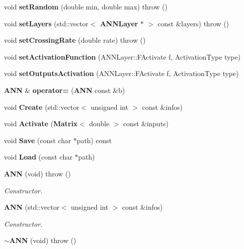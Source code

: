 \begin{DoxyCompactItemize}
\item 
void {\bfseries set\+Random} (double min, double max)  throw ()\label{class_g_a_n_n_1_1_a_n_n_adcedd9edf79df8a07a25d11cdefb5310}

\item 
void {\bfseries set\+Layers} (std\+::vector$<$ {\bf A\+N\+N\+Layer} $\ast$ $>$ const \&layers)  throw ()\label{class_g_a_n_n_1_1_a_n_n_aae6cc0117e368dec728e5164fd4877cc}

\item 
void {\bfseries set\+Crossing\+Rate} (double rate)  throw ()\label{class_g_a_n_n_1_1_a_n_n_a4476dd0e4d95747cae5489db42639190}

\item 
void {\bfseries set\+Activation\+Function} (A\+N\+N\+Layer\+::\+F\+Activate f, Activation\+Type type)\label{class_g_a_n_n_1_1_a_n_n_a416cb5c5b0d916a9f2ed005494f07be6}

\item 
void {\bfseries set\+Outputs\+Activation} (A\+N\+N\+Layer\+::\+F\+Activate f, Activation\+Type type)\label{class_g_a_n_n_1_1_a_n_n_acc21816e2cb7543eb64d01d9f4a2e30a}

\item 
{\bf A\+N\+N} \& {\bfseries operator=} ({\bf A\+N\+N} const \&b)\label{class_g_a_n_n_1_1_a_n_n_ad1891b9081a45caf8ce4b4d5646d210d}

\item 
void {\bfseries Create} (std\+::vector$<$ unsigned int $>$ const \&infos)\label{class_g_a_n_n_1_1_a_n_n_a65b8b6fd67dc3a07a40a39cc611af319}

\item 
void {\bfseries Activate} ({\bf Matrix}$<$ double $>$ const \&inputs)\label{class_g_a_n_n_1_1_a_n_n_a6e5ff8d7eaf90d7f38547763efcb4ab7}

\item 
void {\bfseries Save} (const char $\ast$path) const \label{class_g_a_n_n_1_1_a_n_n_a523bdbe95d22035e8019868f619aa50e}

\item 
void {\bfseries Load} (const char $\ast$path)\label{class_g_a_n_n_1_1_a_n_n_a6509ae3de47262d62a68056c24d06b92}

\item 
{\bf A\+N\+N} (void)  throw ()\label{class_g_a_n_n_1_1_a_n_n_a0dd8c9852d16b0588198e97b80e1a936}

\begin{DoxyCompactList}\small\item\em Constructor. \end{DoxyCompactList}\item 
{\bf A\+N\+N} (std\+::vector$<$ unsigned int $>$ const \&infos)
\begin{DoxyCompactList}\small\item\em Constructor. \end{DoxyCompactList}\item 
{\bf $\sim$\+A\+N\+N} (void)  throw ()\label{class_g_a_n_n_1_1_a_n_n_afb1c6b333b15e87d51dfe4ef8f35ecff}


\end{DoxyCompactItemize}
